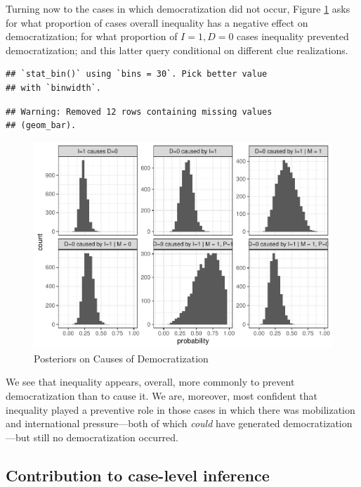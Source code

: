 \documentclass[
  12pt,
]{book}
\begin{document}
Turning now to the cases in which democratization did not occur, Figure \ref{fig:mixedhist2} asks for what proportion of cases overall inequality has a negative effect on democratization; for what proportion of \(I=1, D=0\) cases inequality prevented democratization; and this latter query conditional on different clue realizations.

\begin{verbatim}
## `stat_bin()` using `bins = 30`. Pick better value
## with `binwidth`.
\end{verbatim}

\begin{verbatim}
## Warning: Removed 12 rows containing missing values
## (geom_bar).
\end{verbatim}

\begin{figure}
\centering
\includegraphics{ii_files/figure-latex/mixedhist2-1.pdf}
\caption{\label{fig:mixedhist2}Posteriors on Causes of Democratization}
\end{figure}

We see that inequality appears, overall, more commonly to prevent democratization than to cause it. We are, moreover, most confident that inequality played a preventive role in those cases in which there was mobilization and international pressure---both of which \emph{could} have generated democratization---but still no democratization occurred.

\hypertarget{contribution-to-case-level-inference}{%
\subsection{Contribution to case-level inference}\label{contribution-to-case-level-inference}}
\end{document}
